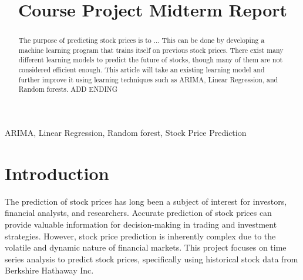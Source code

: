 \documentclass[conference]{IEEEtran}
\begin{document}
\title{Course Project Midterm Report\\

}

\author{
\and
{}
\and
{}
\and
{}
}

\maketitle

\begin{abstract}
The purpose of predicting stock prices is to ...  This can be done by developing a machine learning program that trains itself on previous stock prices.  There exist many different learning models to predict the future of stocks, though many of them are not considered efficient enough.  This article will take an existing learning model and further improve it using learning techniques such as ARIMA, Linear Regression, and Random forests.  ADD ENDING
\end{abstract}

\begin{IEEEkeywords}
ARIMA, Linear Regression, Random forest, Stock Price Prediction
\end{IEEEkeywords}

\section{Introduction}
The prediction of stock prices has long been a subject of interest for investors, financial analysts, and researchers. Accurate prediction of stock prices can provide valuable information for decision-making in trading and investment strategies. However, stock price prediction is inherently complex due to the volatile and dynamic nature of financial markets. This project focuses on time series analysis to predict stock prices, specifically using historical stock data from Berkshire Hathaway Inc.
\end{document}

